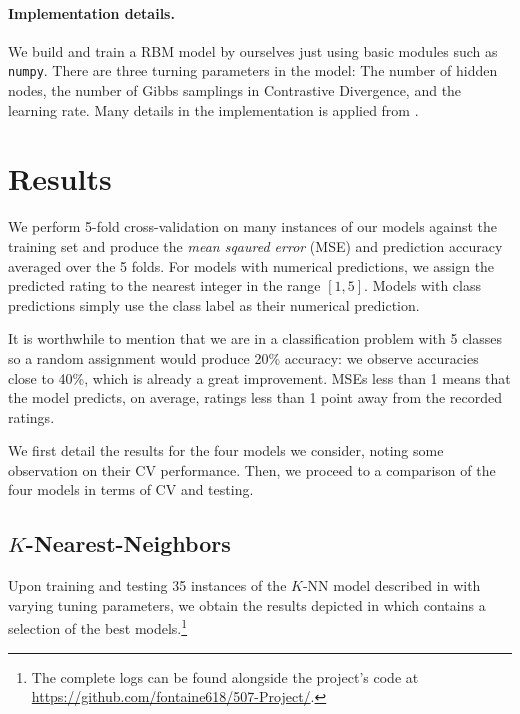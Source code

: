\documentclass[bj, preprint]{imsart}
\begin{document}
\paragraph{Implementation details.}\label{par:method.models.rbm.impl}

We build and train a RBM model by ourselves just using basic modules such as \texttt{numpy}. There are three turning parameters in the model: The number of hidden nodes, the number of Gibbs samplings in Contrastive Divergence, and the learning rate. Many details in the implementation is applied from \cite{hinton2012practical}.


\section{Results}\label{sec:results}

We perform 5-fold cross-validation on many instances of our models against the training set and produce the \textit{mean sqaured error} (MSE) and prediction accuracy averaged over the 5 folds. For models with numerical predictions, we assign the predicted rating to the nearest integer in the range $[1,5]$.  Models with class predictions simply use the class label as their numerical prediction. 

It is worthwhile to mention that we are in a classification problem with 5 classes so a random assignment would produce 20\% accuracy: we observe accuracies close to 40\%, which is already a great improvement. MSEs less than 1 means that the model predicts, on average, ratings less than 1 point away from the recorded ratings.

We first detail the results for the four models we consider, noting some observation on their CV performance. Then, we proceed to a comparison of the four models in terms of CV and testing.

\subsection{$K$-Nearest-Neighbors}\label{sebsec:results.knn}

Upon training and testing 35 instances of the $K$-NN model described in  with varying tuning parameters, we obtain the results depicted in  which contains a selection of the best models.\footnote{The complete logs can be found alongside the project's code at \url{https://github.com/fontaine618/507-Project/}.} 
\end{document}
